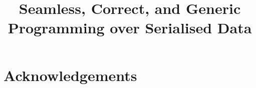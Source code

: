 \documentclass[10pt]{article}
\title{Seamless, Correct, and Generic \\ Programming over Serialised Data}
\author{\iftoggle{BLIND}{ANONYMOUS}{Guillaume Allais}}
\begin{document}
\maketitle





















\section*{Acknowledgements}

\newpage


\newpage
\appendix



\end{document}
